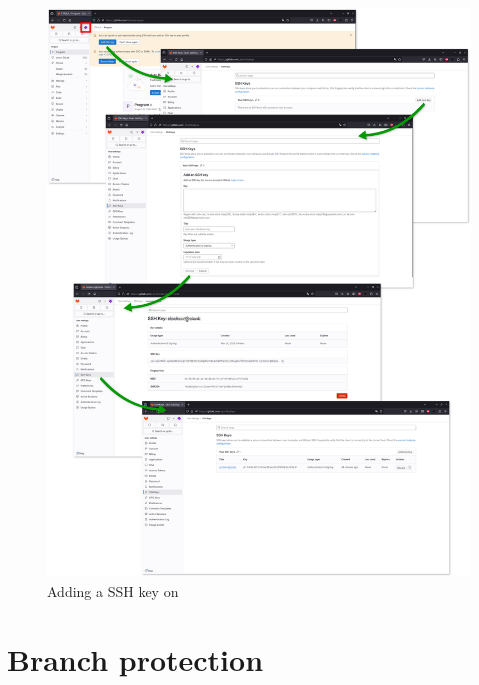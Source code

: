 \begin{figure}[!p]
\includegraphics[width=1.0\textwidth,keepaspectratio=true,draft=\ddst]{img/hosts/gitlab/keys.eps} 
\caption{Adding a SSH key on \gitlab\label{kgitlab}}
\end{figure}

\clearpage

\section{Branch protection}

